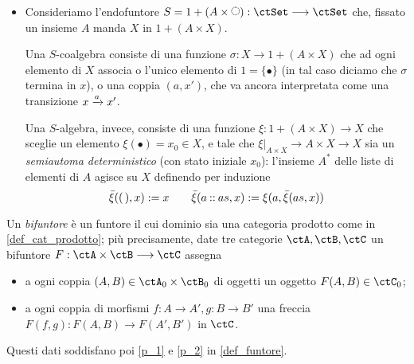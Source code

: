 \begin{examples}
\begin{itemize}
		      Si noti che il funtore \(\ctP_\bbN\) è puntato da una trasformazione naturale \(\eta\) con componenti \(\eta_X : X\to \ctP(\bbN\times X)\), definite da \(x\mapsto\{(0,x)\}\). \`E allora naturale considerare le \(\ctP_\bbN\)-algebre \emph{puntate}, ma descriverle esplicitamente è complicato: se \(U\subseteq \bbN\times X\) e \((x,n)\in U\) diciamo che \(x\) ha peso \(n\); una funzione \(\alpha : \ctP_\bbN X\to X\) consiste di una funzione che ad ogni sottoinsieme di \(\bbN\times X\) associa un elemento di \(X\) che può essere pensato come un insieme di `preferenze' in un insieme \(X\) di candidati, \(\bbN\) è un insieme (infinito, numerabile) di elettori. Ogni sottoinsieme di \(\bbN \times X\) è un insieme di preferenze che gli elettori esprimono (si consentono voti multipli: la relazione \(R\subseteq \bbN\times X\) si legge `\(n\) vota per \(x\)'). Quindi, l'algebra seleziona il candidato in base alle preferenze di voto. Gli omomorfismi di algebre sono quelle funzioni che rispettano le preferenze di voto, e l'elemento \(\alpha(\varnothing)\in X\) è il candidato selezionato se nessuno si presenta alle urne.
		\item Consideriamo l'endofuntore \(S=1+(A\times\blank):\ctSet\fun\ctSet\) che, fissato un insieme \(A\) manda \(X\) in \(1+(A\times X)\).

		      Una \(S\)-coalgebra consiste di una funzione \(\sigma : X\to 1+(A\times X)\) che ad ogni elemento di \(X\) associa o l'unico elemento di \(1=\{\bullet\}\) (in tal caso diciamo che \(\sigma\) termina in \(x\)), o una coppia \((a,x')\), che va ancora interpretata come una transizione \(x\xrightarrow{a}x'\).

		      Una \(S\)-algebra, invece, consiste di una funzione \(\xi : 1+(A\times X)\to X\) che sceglie un elemento \(\xi(\bullet)=x_0\in X\), e tale che \(\xi|_{A\times X}\to A\times X\to X\) sia un \emph{semiautoma deterministico} (con stato iniziale \(x_0\)): l'insieme \(A^*\) delle liste di elementi di \(A\) agisce su \(X\) definendo per induzione
		      \[\bar\xi((\,),x):=x \qquad \bar\xi(a\mathbin{::} as,x) := \xi(a, \bar\xi(as,x))\]
	\end{itemize}
\end{examples}
\begin{definition}[Bifuntore]\label{def_bifuntore}
	Un \emph{bifuntore} è un funtore il cui dominio sia una categoria prodotto come in \ref{def_cat_prodotto}; più precisamente, date tre categorie \(\ctA,\ctB,\ctC\) un bifuntore \(F : \ctA \times \ctB \fun \ctC\) assegna
	\begin{itemize}
		\item a ogni coppia \((A,B)\in \ctA_0\times\ctB_0\) di oggetti un oggetto \(F(A,B) \in\ctC_0\);
		\item a ogni coppia di morfismi \(f : A\to A', g : B\to B'\) una freccia \(F(f,g) : F(A,B)\to F(A',B')\) in \(\ctC\).
	\end{itemize}
	Questi dati soddisfano poi \ref{p_1} e \ref{p_2} in \ref{def_funtore}.
\end{definition}
